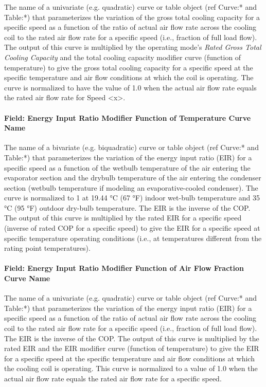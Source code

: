 The name of a univariate (e.g. quadratic) curve or table object (ref Curve:* and Table:*) that parameterizes the variation of the gross total cooling capacity for a specific speed as a function of the ratio of actual air flow rate across the cooling coil to the rated air flow rate for a specific speed (i.e., fraction of full load flow). The output of this curve is multiplied by the operating mode's \textit{Rated Gross Total Cooling Capacity} and the total cooling capacity modifier curve (function of temperature) to give the gross total cooling capacity for a specific speed at the specific temperature and air flow conditions at which the coil is operating. The curve is normalized to have the value of 1.0 when the actual air flow rate equals the rated air flow rate for Speed \textless{}x\textgreater{}.

\paragraph{Field: Energy Input Ratio Modifier Function of Temperature Curve Name}\label{field-energy-input-ratio-function-of-temperature-curve-name}

The name of a bivariate (e.g. biquadratic) curve or table object (ref Curve:* and Table:*) that parameterizes the variation of the energy input ratio (EIR) for a specific speed as a function of the wetbulb temperature of the air entering the evaporator section and the drybulb temperature of the air entering the condenser section (wetbulb temperature if modeling an evaporative-cooled condenser). The curve is normalized to 1 at 19.44 °C (67 °F) indoor wet-bulb temperature and 35 °C (95 °F) outdoor dry-bulb temperature. The EIR is the inverse of the COP. The output of this curve is multiplied by the rated EIR for a specific speed (inverse of rated COP for a specific speed) to give the EIR for a specific speed at specific temperature operating conditions (i.e., at temperatures different from the rating point temperatures).

\paragraph{Field: Energy Input Ratio Modifier Function of Air Flow Fraction Curve Name}\label{field-energy-input-ratio-function-of-air-flow-fraction-curve-name}

The name of a univariate (e.g. quadratic) curve or table object (ref Curve:* and Table:*) that parameterizes the variation of the energy input ratio (EIR) for a specific speed as a function of the ratio of actual air flow rate across the cooling coil to the rated air flow rate for a specific speed (i.e., fraction of full load flow). The EIR is the inverse of the COP. The output of this curve is multiplied by the rated EIR and the EIR modifier curve (function of temperature) to give the EIR for a specific speed at the specific temperature and air flow conditions at which the cooling coil is operating. This curve is normalized to a value of 1.0 when the actual air flow rate equals the rated air flow rate for a specific speed.

